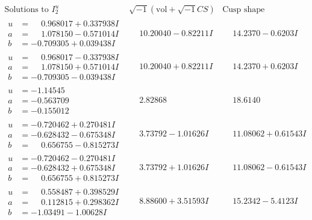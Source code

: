 \documentclass[1p]{elsarticle_modified}
\theoremstyle{definition}
\newcommand{\I}{\sqrt{-1}}
\begin{document}
$$\begin{array}{c|c|c}  
\text{Solutions to }I^u_{2}& \I (\text{vol} + \sqrt{-1}CS) & \text{Cusp shape}\\
 \hline 
\begin{aligned}
u &= \phantom{-}0.968017 + 0.337938 I \\
a &= \phantom{-}1.078150 - 0.571014 I \\
b &= -0.709305 + 0.039438 I\end{aligned}
 & \phantom{-}10.20040 - 0.82211 I & \phantom{-}14.2370 - 0.6203 I \\ \hline\begin{aligned}
u &= \phantom{-}0.968017 - 0.337938 I \\
a &= \phantom{-}1.078150 + 0.571014 I \\
b &= -0.709305 - 0.039438 I\end{aligned}
 & \phantom{-}10.20040 + 0.82211 I & \phantom{-}14.2370 + 0.6203 I \\ \hline\begin{aligned}
u &= -1.14545\phantom{ +0.000000I} \\
a &= -0.563709\phantom{ +0.000000I} \\
b &= -0.155012\phantom{ +0.000000I}\end{aligned}
 & \phantom{-}2.82868\phantom{ +0.000000I} & \phantom{-}18.6140\phantom{ +0.000000I} \\ \hline\begin{aligned}
u &= -0.720462 + 0.270481 I \\
a &= -0.628432 - 0.675348 I \\
b &= \phantom{-}0.656755 - 0.815273 I\end{aligned}
 & \phantom{-}3.73792 - 1.01626 I & \phantom{-}11.08062 + 0.61543 I \\ \hline\begin{aligned}
u &= -0.720462 - 0.270481 I \\
a &= -0.628432 + 0.675348 I \\
b &= \phantom{-}0.656755 + 0.815273 I\end{aligned}
 & \phantom{-}3.73792 + 1.01626 I & \phantom{-}11.08062 - 0.61543 I \\ \hline\begin{aligned}
u &= \phantom{-}0.558487 + 0.398529 I \\
a &= \phantom{-}0.112815 + 0.298362 I \\
b &= -1.03491 - 1.00628 I\end{aligned}
 & \phantom{-}8.88600 + 3.51593 I & \phantom{-}15.2342 - 5.4123 I \\ \hline\begin{aligned}

\end{aligned}
\end{array}$$
\end{document}
